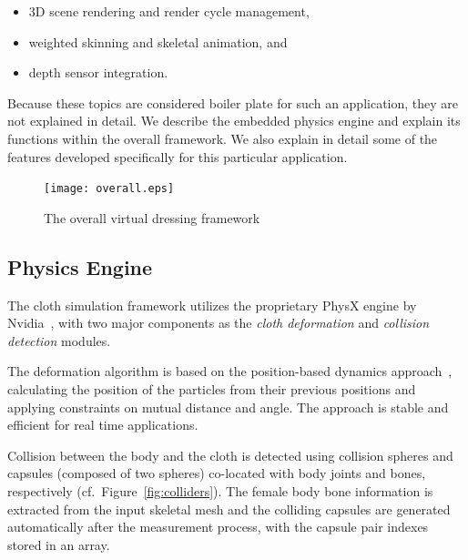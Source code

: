 \documentclass[number,preprint,review,12pt]{elsarticle}
\begin{document}
\begin{itemize}
  \item 3D scene rendering and render cycle management, 
  \item weighted skinning and skeletal animation, and
  \item depth sensor integration.
\end{itemize}

Because these topics are considered boiler plate for such an application, they are not explained in detail. We describe the embedded physics engine and explain its functions within the overall framework. We also explain in detail some of the features developed specifically for this particular application. 

\begin{figure}[htbp]
	\centerline{
	\texttt{[image: overall.eps]}
	}
	\caption{The overall virtual dressing framework}
	\label{fig:overall}
\end{figure}

\subsection{Physics Engine}
\label{subsec:Physics}
The cloth simulation framework utilizes the proprietary PhysX engine by Nvidia~\cite{Kim2011}, with two major components as the {\em cloth deformation} and {\em collision detection} modules. 

The deformation algorithm is based on the position-based dynamics approach~\cite{Mullera2007}, calculating the position of the particles from their previous positions and applying constraints on mutual distance and angle. The approach is stable and efficient for real time applications. 

Collision between the body and the cloth is detected using collision spheres and capsules (composed of two spheres) co-located with body joints and bones, respectively (cf.~Figure~\ref{fig:colliders}). The female body bone information is extracted from the input skeletal mesh and the colliding capsules are generated automatically after the measurement process, with the capsule pair indexes stored in an array.
\end{document}
